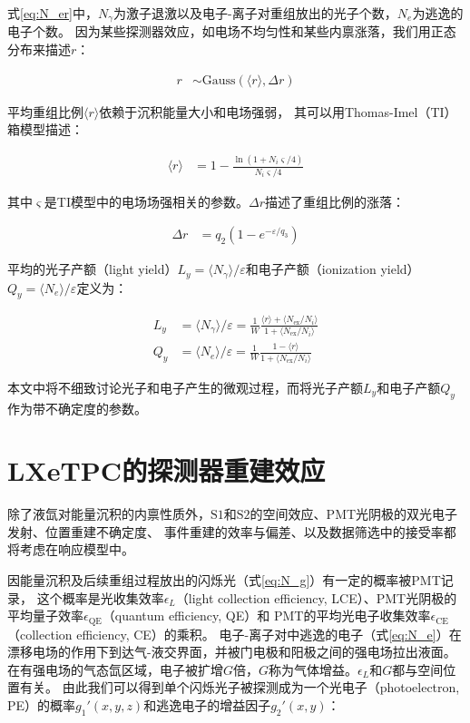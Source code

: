 式\ref{eq:N_er}中，$N_\gamma$为激子退激以及电子-离子对重组放出的光子个数，$N_{e}$为逃逸的电子个数。
因为某些探测器效应，如电场不均匀性和某些内禀涨落\cite{lux_collaboration_tritium_2016}，我们用正态分布来描述$r$：

\begin{align}
    \label{eq:r}
    r &\sim \mathrm{Gauss}\left(\langle r\rangle,\Delta r\right)
\end{align}

平均重组比例$\langle r\rangle$依赖于沉积能量大小和电场强弱，
其可以用Thomas-Imel（TI）箱模型描述\cite{thomas_recombination_1987}：

\begin{align}
    \label{eq:mr}
    \langle r\rangle &= 1 - \frac{\ln{\left(1+N_i\varsigma/4\right)}}{N_i\varsigma/4}
\end{align}

其中$\varsigma$是TI模型中的电场场强相关的参数。$\Delta r$描述了重组比例的涨落：

\begin{align}
    \label{eq:sr}
    \Delta r &= q_2\left(1-e^{-\varepsilon /q_3}\right)
\end{align}

平均的光子产额（light yield）$L_y=\langle N_\gamma\rangle/\varepsilon $和电子产额（ionization yield）$Q_y=\langle N_e\rangle/\varepsilon $定义为：

\begin{align}
    \label{eq:N_g}
    L_y &= \langle N_\gamma\rangle/\varepsilon  = \frac{1}{W}\frac{\langle r\rangle+\langle N_{\mathrm{ex}}/N_i\rangle}{1+\langle N_{\mathrm{ex}}/N_i\rangle} \\
    \label{eq:N_e}
    Q_y &= \langle N_e\rangle/\varepsilon  = \frac{1}{W}\frac{1-\langle r\rangle}{1+\langle N_{\mathrm{ex}}/N_i\rangle}
\end{align}

本文中将不细致讨论光子和电子产生的微观过程，而将光子产额$L_y$和电子产额$Q_y$作为带不确定度的参数。

\section{LXeTPC的探测器重建效应}

除了液氙对能量沉积的内禀性质外，$\mathrm{S1}$和$\mathrm{S2}$的空间效应、PMT光阴极的双光电子发射、位置重建不确定度、
事件重建的效率与偏差、以及数据筛选中的接受率都将考虑在响应模型中。

因能量沉积及后续重组过程放出的闪烁光（式\ref{eq:N_g}）有一定的概率被PMT记录，
这个概率是光收集效率$\epsilon_L$（light collection efficiency, LCE）、PMT光阴极的平均量子效率$\epsilon_{\mathrm{QE}}$（quantum efficiency, QE）和
PMT的平均光电子收集效率$\epsilon_{\mathrm{CE}}$（collection efficiency, CE）的乘积。
电子-离子对中逃逸的电子（式\ref{eq:N_e}）在漂移电场的作用下到达气-液交界面，并被门电极和阳极之间的强电场拉出液面。
在有强电场的气态氙区域，电子被扩增$G$倍，$G$称为气体增益。$\epsilon_L$和$G$都与空间位置有关。
由此我们可以得到单个闪烁光子被探测成为一个光电子（photoelectron, PE）的概率$g_1'(x,y,z)$和逃逸电子的增益因子$g_2'(x,y)$：

